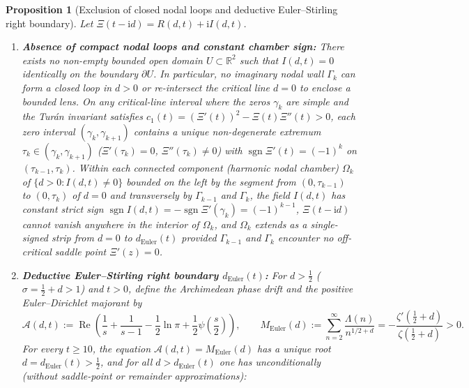\documentclass[11pt,a4paper,reqno]{amsart}
\newtheorem{proposition}[theorem]{Proposition}
\theoremstyle{definition}
\theoremstyle{remark}
\numberwithin{equation}{section}
\newcommand{\ii}{\mathrm{i}}
\newcommand{\Rea}{\operatorname{Re}}
\begin{document}
\begin{proposition}[Exclusion of closed nodal loops and deductive Euler--Stirling right boundary]\label{prop:maximum_and_euler}
Let $\Xi(t-\ii d) = R(d,t) + \ii I(d,t)$.
\begin{enumerate}
\item[\textup{(a)}] \textbf{Absence of compact nodal loops and constant chamber sign:} There exists no non-empty bounded open domain $U \subset \mathbb{R}^2$ such that $I(d,t) = 0$ identically on the boundary $\partial U$. In particular, no imaginary nodal wall $\Gamma_k$ can form a closed loop in $d > 0$ or re-intersect the critical line $d = 0$ to enclose a bounded lens. On any critical-line interval where the zeros $\gamma_k$ are simple and the Tur\'an invariant satisfies $c_1(t) = (\Xi'(t))^2 - \Xi(t)\Xi''(t) > 0$, each zero interval $(\gamma_k, \gamma_{k+1})$ contains a unique non-degenerate extremum $\tau_k \in (\gamma_k, \gamma_{k+1})$ ($\Xi'(\tau_k) = 0$, $\Xi''(\tau_k) \neq 0$) with $\operatorname{sgn}\Xi'(t) = (-1)^k$ on $(\tau_{k-1}, \tau_k)$. Within each connected component (harmonic nodal chamber) $\Omega_k$ of $\{d > 0 : I(d,t) \neq 0\}$ bounded on the left by the segment from $(0,\tau_{k-1})$ to $(0,\tau_k)$ of $d = 0$ and transversely by $\Gamma_{k-1}$ and $\Gamma_k$, the field $I(d,t)$ has constant strict sign $\operatorname{sgn} I(d,t) = -\operatorname{sgn}\Xi'(\gamma_k) = (-1)^{k-1}$, $\Xi(t-\ii d)$ cannot vanish anywhere in the interior of $\Omega_k$, and $\Omega_k$ extends as a single-signed strip from $d = 0$ to $d_{\mathrm{Euler}}(t)$ provided $\Gamma_{k-1}$ and $\Gamma_k$ encounter no off-critical saddle point $\Xi'(z) = 0$.
\item[\textup{(b)}] \textbf{Deductive Euler--Stirling right boundary $d_{\mathrm{Euler}}(t)$:} For $d > \frac{1}{2}$ ($\sigma = \frac{1}{2}+d > 1$) and $t > 0$, define the Archimedean phase drift and the positive Euler--Dirichlet majorant by
\begin{equation}\label{eq:A_and_M_def}
\mathcal{A}(d,t) := \Rea\!\left(\frac{1}{s} + \frac{1}{s-1} - \frac{1}{2}\ln\pi + \frac{1}{2}\psi\!\left(\frac{s}{2}\right)\right), \qquad M_{\mathrm{Euler}}(d) := \sum_{n=2}^\infty \frac{\Lambda(n)}{n^{1/2+d}} = -\frac{\zeta'(\frac{1}{2}+d)}{\zeta(\frac{1}{2}+d)} > 0.
\end{equation}
For every $t \ge 10$, the equation $\mathcal{A}(d,t) = M_{\mathrm{Euler}}(d)$ has a unique root $d = d_{\mathrm{Euler}}(t) > \frac{1}{2}$, and for all $d > d_{\mathrm{Euler}}(t)$ one has unconditionally (without saddle-point or remainder approximations):

\end{enumerate}
\end{proposition}
\end{document}
